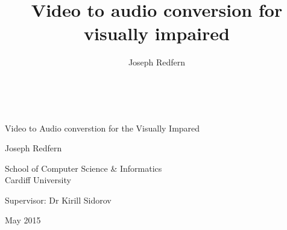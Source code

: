 \documentclass[11pt,a4paper]{memoir}
\author{Joseph Redfern}
\title{Video to audio conversion for visually impaired}
\date{}
\begin{document}
\thispagestyle{empty}

{%
\sffamily
\centering
\Large

~\vspace{\fill}

{\huge 
    Video to Audio converstion for the Visually Impared
}

\vspace{2.5cm}

{\LARGE
    Joseph Redfern
}

\vspace{3.5cm}

School of Computer Science \& Informatics\\
Cardiff University

\vspace{3.5cm}

Supervisor: Dr Kirill Sidorov 

\vspace{\fill}

May 2015

}

\cleardoublepage


\clearpage

\tableofcontents*

\clearpage


\end{document}
